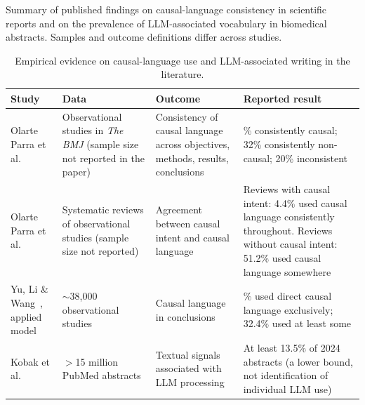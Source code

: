 \documentclass[11pt]{article}
\begin{document}
\begin{table}[htbp]
  \centering
  \caption{Empirical evidence on causal-language use and LLM-associated writing in the literature.}
  \label{tab:empirical-evidence}
  \begin{minipage}{\textwidth}
    \small
    Summary of published findings on causal-language consistency in scientific reports and on the prevalence of LLM-associated vocabulary in biomedical abstracts. Samples and outcome definitions differ across studies.
  \end{minipage}
  \vspace{0.5em}

  \footnotesize
  \renewcommand{\arraystretch}{1.2}
  \setlength{\tabcolsep}{4pt}
  \begin{tabularx}{\textwidth}{@{}>{\raggedright\arraybackslash}p{}
                                  >{\raggedright\arraybackslash}p{}
                                  >{\raggedright\arraybackslash}p{}
                                  >{\raggedright\arraybackslash}X@{}}
    \toprule
    \textbf{Study} & \textbf{Data} & \textbf{Outcome} & \textbf{Reported result} \\
    \midrule
    Olarte Parra et al.~\cite{olarteparra2021}
      & Observational studies in \textit{The BMJ} (sample size not reported in the paper)
      & Consistency of causal language across objectives, methods, results, conclusions
      & 48\% consistently causal; 32\% consistently non-causal; 20\% inconsistent \\
    \addlinespace
    Olarte Parra et al.~\cite{olarteparra2022}
      & Systematic reviews of observational studies (sample size not reported)
      & Agreement between causal intent and causal language
      & Reviews with causal intent: 4.4\% used causal language consistently throughout. Reviews without causal intent: 51.2\% used causal language somewhere \\
    \addlinespace
    Yu, Li \& Wang~\cite{yu2019}, applied model
      & $\sim$38,000 observational studies
      & Causal language in conclusions
      & 21.7\% used direct causal language exclusively; 32.4\% used at least some \\
    \addlinespace
    Kobak et al.~\cite{kobak2025}
      & $>$15 million PubMed abstracts
      & Textual signals associated with LLM processing
      & At least 13.5\% of 2024 abstracts (a lower bound, not identification of individual LLM use) \\
    \bottomrule
  \end{tabularx}
\end{table}
\end{document}
